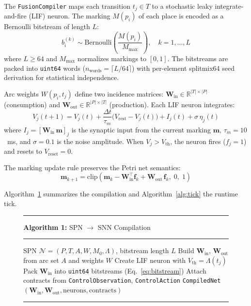 \documentclass[twocolumn,preprintnumbers,amsmath,amssymb,prl,floatfix]{revtex4-2}
\begin{document}
The \texttt{FusionCompiler} maps each transition $t_j \in T$ to a
stochastic leaky integrate-and-fire (LIF) neuron.  The marking
$M(p_i)$ of each place is encoded as a Bernoulli bitstream of length
$L$:
%
\begin{equation}
  b_i^{(k)} \sim \mathrm{Bernoulli}\!\left(\frac{M(p_i)}{M_{\max}}\right),
  \quad k = 1, \ldots, L
  \label{eq:bitstream}
\end{equation}
%
where $L \geq 64$ and $M_{\max}$ normalizes markings to $[0,1]$.
The bitstreams are packed into \texttt{uint64} words
($n_\mathrm{words} = \lceil L/64 \rceil$) with per-element
splitmix64 seed derivation for statistical independence.

Arc weights $W(p_i, t_j)$ define two incidence matrices:
$\mathbf{W}_\mathrm{in} \in \mathbb{R}^{|T| \times |P|}$ (consumption)
and $\mathbf{W}_\mathrm{out} \in \mathbb{R}^{|P| \times |T|}$
(production).  Each LIF neuron integrates:
%
\begin{equation}
  V_j(t+1) = V_j(t) + \frac{\Delta t}{\tau_m}
  \bigl(V_\mathrm{rest} - V_j(t)\bigr)
  + I_j(t) + \sigma\,\eta_j(t)
  \label{eq:lif}
\end{equation}
%
where $I_j = [\mathbf{W}_\mathrm{in}\,\mathbf{m}]_j$ is the
synaptic input from the current marking $\mathbf{m}$,
$\tau_m = 10$~ms, and $\sigma = 0.1$ is the noise amplitude.
When $V_j > V_\mathrm{th}$, the neuron fires ($f_j = 1$) and resets
to $V_\mathrm{reset} = 0$.

The marking update rule preserves the Petri net semantics:
%
\begin{equation}
  \mathbf{m}_{k+1} = \mathrm{clip}\!\left(
    \mathbf{m}_k - \mathbf{W}_\mathrm{in}^\top \mathbf{f}_k
    + \mathbf{W}_\mathrm{out}\,\mathbf{f}_k,\; 0,\; 1\right)
  \label{eq:marking}
\end{equation}

Algorithm~\ref{alg:compile} summarizes the compilation and
Algorithm~\ref{alg:tick} the runtime tick.

\begin{figure}[t]
\hrule\smallskip
\textbf{Algorithm 1:} SPN $\to$ SNN Compilation
\label{alg:compile}
\smallskip\hrule\smallskip
\begin{algorithmic}[1]
\Require SPN $\mathcal{N} = (P, T, A, W, M_0, \Lambda)$,
         bitstream length $L$
\State Build $\mathbf{W}_\mathrm{in}$, $\mathbf{W}_\mathrm{out}$
       from arc set $A$ and weights $W$
  \State Create LIF neuron with
         $V_\mathrm{th} = \Lambda(t_j)$
\EndFor
\State Pack $\mathbf{W}_\mathrm{in}$ into
       \texttt{uint64} bitstreams (Eq.~\ref{eq:bitstream})
\State Attach contracts from \texttt{ControlObservation},
       \texttt{ControlAction}
\State \Return \texttt{CompiledNet}
       $(\mathbf{W}_\mathrm{in}, \mathbf{W}_\mathrm{out},
         \mathrm{neurons}, \mathrm{contracts})$
\end{algorithmic}
\smallskip\hrule
\end{figure}
\end{document}
